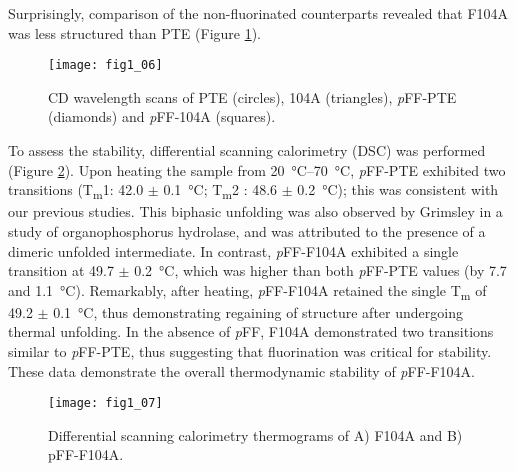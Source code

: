\begin{refsection}
Surprisingly, comparison of the non-fluorinated counterparts revealed that
F104A was less structured than PTE (Figure \ref{fig:CD-fig}). 

\begin{figure}[h!] \centering \texttt{[image: fig1\_06]}
    \caption[CD wavelength scans of PTE (circles), 104A (triangles),
    \emph{p}FF-PTE (diamonds) and \emph{p}FF-104A (squares).]{CD wavelength
        scans of PTE (circles), 104A (triangles), \emph{p}FF-PTE (diamonds) and
        \emph{p}FF-104A (squares).} \label{fig:CD-fig} 
\end{figure}

To assess the stability, differential scanning calorimetry (DSC) was performed
(Figure \ref{fig:DSC-fig}). Upon heating the sample from \SIrange{20}{70}{\celsius},
\emph{p}FF-PTE exhibited two transitions (T\textsubscript{m}1: 42.0 $\pm$
\SI{0.1}{\celsius}; T\textsubscript{m}2 : 48.6 $\pm$ \SI{0.2}{\celsius}); this
was consistent with our previous studies\cite{Baker2011b}. This biphasic
unfolding was also observed by Grimsley   in a study of
organophosphorus hydrolase, and was attributed to the presence of a dimeric
unfolded intermediate\cite{Grimsley1997b}. In contrast, \emph{p}FF-F104A
exhibited a single transition at 49.7 $\pm$ \SI{0.2}{\celsius}, which was
higher than both \emph{p}FF-PTE values (by 7.7 and \SI{1.1}{\celsius}).
Remarkably, after heating, \emph{p}FF-F104A retained the single
T\textsubscript{m} of 49.2 $\pm$ \SI{0.1}{\celsius}, thus demonstrating
regaining of structure after undergoing thermal unfolding.  In the absence of
\emph{p}FF, F104A demonstrated two transitions similar to \emph{p}FF-PTE, thus
suggesting that fluorination was critical for stability.  These data
demonstrate the overall thermodynamic stability of \emph{p}FF-F104A.

\begin{figure}[h!] \centering \texttt{[image: fig1\_07]}
    \caption[Differential scanning calorimetry thermograms of (A) F104A and (B)
    \emph{p}FF-F104A.]{Differential scanning calorimetry thermograms of A)
    F104A and B) pFF-F104A.} \label{fig:DSC-fig} 
\end{figure}


\end{refsection}
